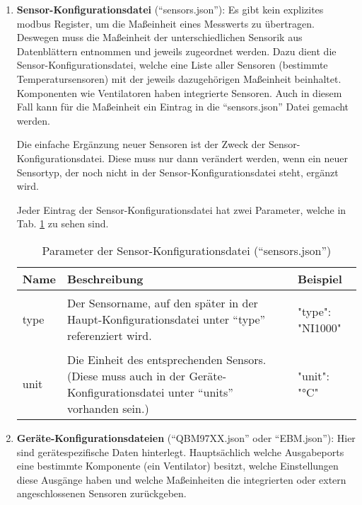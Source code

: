 \begin{enumerate}

	\item \textbf{Sensor-Konfigurationsdatei} (\enquote{sensors.json}): Es gibt kein explizites \gls{modbus} Register, um die Maßeinheit eines Messwerts zu übertragen. Deswegen muss die Maßeinheit der unterschiedlichen Sensorik aus Datenblättern entnommen und jeweils zugeordnet werden. Dazu dient die Sensor-Konfigurationsdatei, welche eine Liste aller Sensoren (\zB bestimmte Temperatursensoren) mit der jeweils dazugehörigen Maßeinheit beinhaltet. Komponenten wie Ventilatoren haben integrierte Sensoren. Auch in diesem Fall kann für die Maßeinheit ein Eintrag in die \enquote{sensors.json} Datei gemacht werden. 
	
	Die einfache Ergänzung neuer Sensoren ist der Zweck der Sensor-Konfigurationsdatei. Diese muss nur dann verändert werden, wenn ein neuer Sensortyp, der noch nicht in der Sensor-Konfigurationsdatei steht, ergänzt wird. 
	
	Jeder Eintrag der Sensor-Konfigurationsdatei hat zwei Parameter, welche in Tab. \ref{tab:sensors_json_parameter} zu sehen sind.
    
\begin{table}[h]
    \caption{Parameter der Sensor-Konfigurationsdatei (\enquote{sensors.json})}
    \label{tab:sensors_json_parameter}
    \begin{tabular}{p{} p{} | p{}}
        \toprule
        \textbf{Name} & \textbf{Beschreibung} & \textbf{Beispiel} \\
        \midrule
        type & Der Sensorname, auf den später in der Haupt-Konfigurationsdatei unter \enquote{type} referenziert wird. &  
        \begin{jsonTable}
"type": "NI1000"
        \end{jsonTable} 
        \\
        unit & Die Einheit des entsprechenden Sensors. (Diese muss auch in der Geräte-Konfigurationsdatei unter \enquote{units} vorhanden sein.) &  
        \begin{jsonTable}
"unit": "°C"
        \end{jsonTable} 
        \\
        \bottomrule
    \end{tabular}
\end{table}
	
		
	\item \textbf{Geräte-Konfigurationsdateien} (\zB \enquote{QBM97XX.json} oder \enquote{EBM.json}): Hier sind gerätespezifische Daten hinterlegt. Hauptsächlich welche Ausgabeports eine bestimmte Komponente (\zB ein Ventilator) besitzt, welche Einstellungen diese Ausgänge haben und \ggf welche Maßeinheiten die integrierten oder extern angeschlossenen Sensoren zurückgeben. 
	

\end{enumerate}
